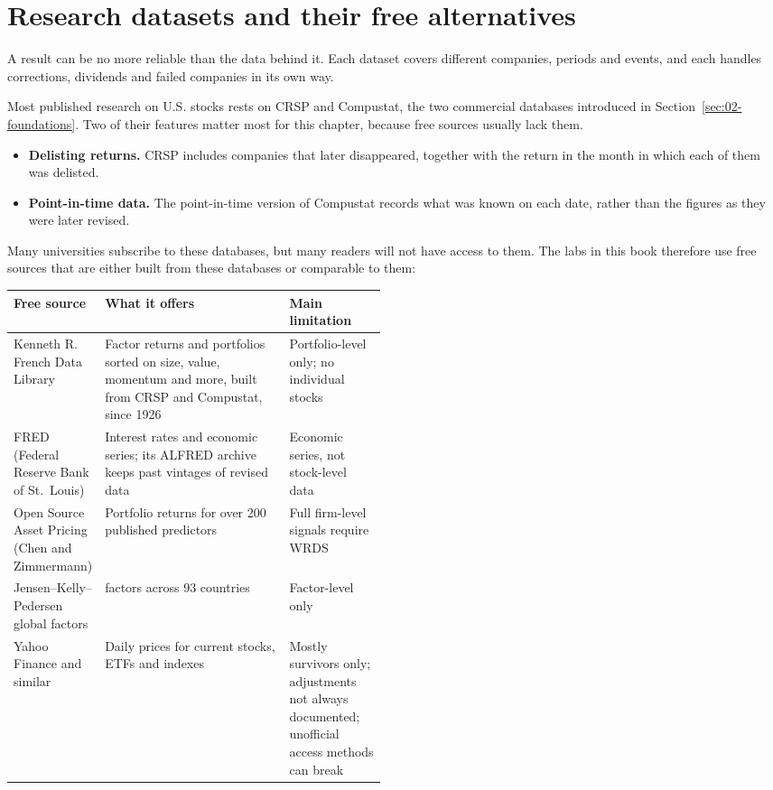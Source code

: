 \section{Research datasets and their free alternatives}
\label{sec:02-datasets}

A result can be no more reliable than the data behind it. Each dataset covers different companies, periods and events, and each handles corrections, dividends and failed companies in its own way. 

Most published research on U.S. stocks rests on CRSP and Compustat, the two commercial databases introduced in Section~\ref{sec:02-foundations}. Two of their features matter most for this chapter, because free sources usually lack them.

\begin{itemize}
  \item \textbf{Delisting returns.} CRSP includes companies that later disappeared, together with the return in the month in which each of them was delisted.
  \item \textbf{Point-in-time data.} The point-in-time version of Compustat records what was known on each date, rather than the figures as they were later revised.
\end{itemize}

Many universities subscribe to these databases, but many readers will not have access to them. The labs in this book therefore use free sources that are either built from these databases or comparable to them:

\begin{center}
\small
\begin{tabularx}{0.9\linewidth}{@{}>{\raggedright\arraybackslash}p{0.22\linewidth}>{\raggedright\arraybackslash}X>{\raggedright\arraybackslash}p{0.26\linewidth}@{}}
\toprule
Free source & What it offers & Main limitation \\
\midrule
Kenneth R. French Data Library & Factor returns and portfolios sorted on size, value, momentum and more, built from CRSP and Compustat, since 1926 & Portfolio-level only; no individual stocks \\
FRED (Federal Reserve Bank of St.\ Louis) & Interest rates and economic series; its ALFRED archive keeps past vintages of revised data & Economic series, not stock-level data \\
Open Source Asset Pricing (Chen and Zimmermann) & Portfolio returns for over 200 published predictors & Full firm-level signals require WRDS \\
Jensen--Kelly--Pedersen global factors & 153 factors across 93 countries & Factor-level only \\
Yahoo Finance and similar & Daily prices for current stocks, ETFs and indexes & Mostly survivors only; adjustments not always documented; unofficial access methods can break \\
\bottomrule
\end{tabularx}
\end{center}

